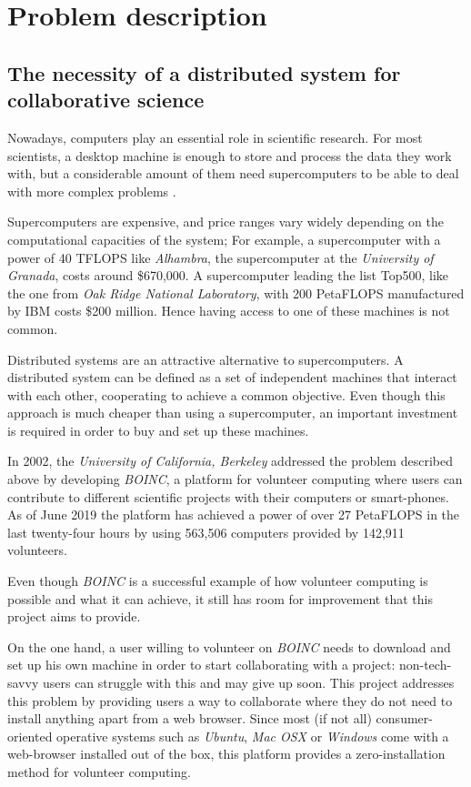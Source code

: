 \chapter{Problem description}
\section{The necessity of a distributed system for collaborative science}
Nowadays, computers play an essential role in scientific research. For most scientists, a desktop machine is enough to store and process the data they work with, but a considerable amount of them need supercomputers to be able to deal with more complex problems \cite{computing-in-science}.

Supercomputers are expensive, and price ranges vary widely depending on the computational capacities of the system; For example, a supercomputer with a power of 40 TFLOPS like \textit{Alhambra}, the supercomputer at the \textit{University of Granada}, costs around \$670,000\cite{ideal-alhambra}. A supercomputer leading the list Top500,  like the one from \textit{Oak Ridge National Laboratory}, with 200 PetaFLOPS manufactured by IBM costs \$200 million\cite{oak-ridge}. Hence having access to one of these machines is not common.

Distributed systems are an attractive alternative to supercomputers. A distributed system can be defined as a set of independent machines that interact with each other, cooperating to achieve a common objective. Even though this approach is much cheaper than using a supercomputer, an important investment is required in order to buy and set up these machines.

In 2002, the \textit{University of California, Berkeley} addressed the problem described above by developing \textit{BOINC}\cite{boinc-website}, a platform for volunteer computing where users can contribute to different scientific projects with their computers or smart-phones. As of June 2019 the platform has achieved a power of over 27 PetaFLOPS in the last twenty-four hours by using 563,506 computers provided by 142,911 volunteers.

Even though \textit{BOINC} is a successful example of how volunteer computing is possible and what it can achieve, it still has room for improvement that this project aims to provide. 

On the one hand, a user willing to volunteer on \textit{BOINC} needs to download and set up his own machine in order to start collaborating with a project: non-tech-savvy users can struggle with this and may give up soon. This project addresses this problem by providing users a way to collaborate where they do not need to install anything apart from a web browser. Since most (if not all) consumer-oriented operative systems such as \textit{Ubuntu}, \textit{Mac OSX} or \textit{Windows} come with a web-browser installed out of the box, this platform provides a zero-installation method for volunteer computing.

